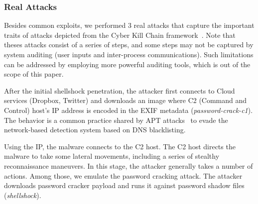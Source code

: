 \subsubsection{Real Attacks}
\label{subsubsec:attack-cases}

Besides common exploits, we performed 3 real attacks that capture the important traits of attacks depicted from the Cyber Kill Chain framework~\cite{cyberkillchain}. 
Note that theses attacks consist of a series of steps, and some steps may not be captured by system auditing (\eg user inputs and inter-process communications).
Such limitations can be addressed by employing more powerful auditing tools, which is out of the scope of this paper.


After the initial shellshock penetration, the attacker first connects to Cloud services (\eg Dropbox, Twitter) and downloads an image where C2 (Command and Control) host's IP address is encoded in the EXIF metadata (\emph{password-crack-c1}). The behavior is a common practice shared by APT attacks~\cite{hammertoss,vpnfilter} to evade the network-based detection system based on DNS blacklisting.

Using the IP, the malware connects to the C2 host. 
The C2 host directs the malware to take some lateral movements, including a series of stealthy reconnaissance maneuvers. 
In this stage, the attacker generally takes a number of actions. 
Among those, we emulate the password cracking attack. 
The attacker downloads password cracker payload  and runs it against password shadow files (\emph{shellshock}).

